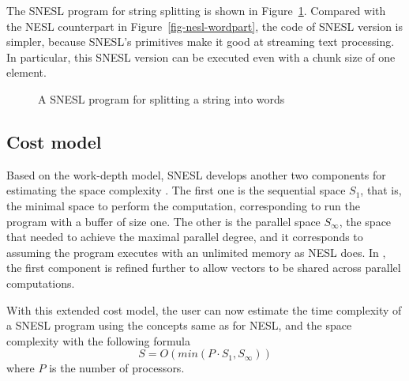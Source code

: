 The SNESL program for string splitting is shown in Figure~\ref{fig-snesl-wordpart}. 
Compared with the NESL counterpart in Figure~\ref{fig-nesl-wordpart}, the code of SNESL version is simpler, because SNESL's primitives make it good at streaming text processing. 
In particular, this SNESL version can be executed even with a chunk size of one element.
 
\begin{figure}[H]
	 
	\caption{{A SNESL program for splitting a string into words \label{fig-snesl-wordpart}}}
\end{figure}


\subsection{Cost model}

Based on the work-depth model, SNESL develops another two components for estimating the space complexity \cite{MadFil13}. 
The first one is the sequential space $S_1$, that is, the minimal space to perform the computation, corresponding to run the program with a buffer of size one. 
The other is the parallel space $S_\infty$, the space that needed to achieve the maximal parallel degree, and it corresponds to assuming the program executes with an unlimited memory as NESL does.
In \cite{Fphd}, the first component is refined further to allow vectors to be shared across parallel computations.

With this extended cost model, the user can now estimate the time complexity of a SNESL program using the concepts same as for NESL, and the space complexity with the following formula
$$ S = O(min(P \cdot S_1, S_\infty)) $$
where $P$ is the number of processors.
	
%	
%
